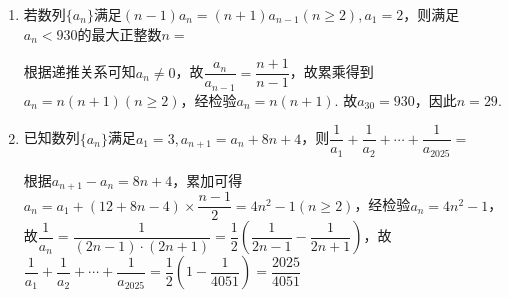 \begin{enumerate}
    \item 若数列$\{a_n\}$满足$(n-1)a_n = (n+1)a_{n-1}(n \geq 2), a_1 = 2$，则满足$a_n < 930$的最大正整数$n = $
    \begin{jieda}
        根据递推关系可知$a_n \neq 0$，故$\dfrac{a_n}{a_{n-1}} = \dfrac{n+1}{n-1}$，故累乘得到$a_n = n(n+1)(n \geq 2)$，经检验$a_n = n(n+1)$. 故$a_{30} = 930$，因此$n = 29$.
    \end{jieda}

    \item 已知数列$\{a_n\}$满足$a_1 = 3, a_{n+1} = a_n + 8n+4$，则$\dfrac{1}{a_1} + \dfrac{1}{a_2} + \cdots +\dfrac{1}{a_{2025}} = $
    \begin{jieda}
        根据$a_{n+1} - a_n = 8n+4$，累加可得$a_n = a_1 + (12 + 8n-4) \times \dfrac{n-1}{2} = 4n^2-1 (n\geq2)$，经检验$a_n = 4n^2 - 1$，故$\dfrac{1}{a_n} = \dfrac{1}{(2n-1)\cdot(2n+1)} = \dfrac{1}{2}\left(\dfrac{1}{2n-1} - \dfrac{1}{2n+1}\right)$，故$\dfrac{1}{a_1} + \dfrac{1}{a_2} + \cdots +\dfrac{1}{a_{2025}} = \dfrac{1}{2}\left(1 - \dfrac{1}{4051}\right) = \dfrac{2025}{4051}$
    \end{jieda}


\end{enumerate}
